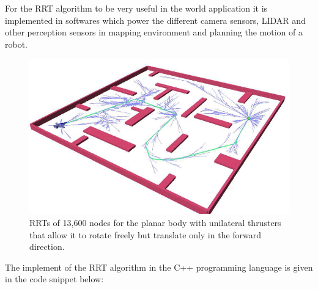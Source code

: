 For the RRT algorithm to be very useful in the world application it is implemented in softwares which power the different camera sensors, LIDAR and other perception sensors in mapping environment and planning the motion of a robot.

\begin{figure}[h]
    \centering
    \includegraphics[scale=0.5]{images/rrt1.png}
    \caption{RRTs of 13,600 nodes for the planar body with unilateral thrusters that allow it to rotate freely but translate only in the forward direction. \cite{lavalle2001randomized}}
\end{figure}

The implement of the RRT algorithm in the C++ programming language is given in the code snippet below:

